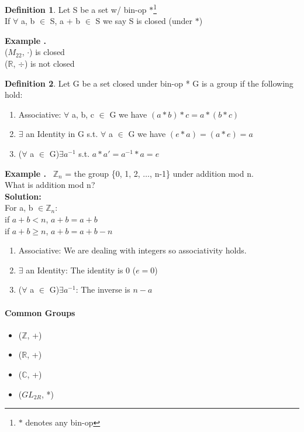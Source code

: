 \documentclass{article}
\newcounter{example}
\newcounter{solution}
\theoremstyle{definition}
\newtheorem{definition}{Definition}[section]
\theoremstyle{claim}
\theoremstyle{remark}
\theoremstyle{theorem}
\newcommand\Example{%
  \stepcounter{example}%
  \textbf{Example \theexample.}~%
  \setcounter{solution}{0}%
}
\newcommand\TheSolution{%
  \textbf{Solution:}\\%
}
\begin{document}
\begin{flushleft}
\begin{definition}{Let S be a set w/ bin-op $*$\footnote{$*$ denotes any bin-op}}\\
If $\forall$ a, b $\in$ S, a + b $\in$ S we say S is closed (under $*$)
\end{definition}
\Example                            \\
($M_{22}$, $\cdot$) is closed       \\
($\mathbb{R}$, $\div$) is not closed\\
\begin{definition}{Let G be a set closed under bin-op *}
G is a group if the following hold:
\begin{enumerate}
  \item Associative: $\forall$ a, b, c $\in$ G we have $(a * b) * c = a * (b * c)$
  \item $\exists$ an Identity in G s.t. $\forall$ a $\in$ G we have $(e * a) = (a * e) = a$
  \item ($\forall$ a $\in$ G)$\exists a^{-1}$ s.t. $a * a\prime = a^{-1} * a = e$
\end{enumerate}
\end{definition}
\Example $\mathbb{Z}_{n}$ = the group \{0, 1, 2, $\dots$, n-1\} under addition mod n.\\
What is addition mod n?\newline \\

\TheSolution 
For a, b $\in \mathbb{Z}_{n}$:  \\
if $a + b < n$, $a + b = a + b$ \\
if $a + b \geq n$, $a + b = a + b - n$\newline\\

\begin{enumerate}
  \item Associative: We are dealing with integers so associativity holds.
  \item $\exists$ an Identity: The identity is 0 ($e = 0$) 
  \item ($\forall$ a $\in$ G)$\exists a^{-1}$: The inverse is $n - a$
\end{enumerate}

\paragraph{Common Groups}
\begin{itemize}
  \item ($\mathbb{Z}$, +)
  \item ($\mathbb{R}$, +)
  \item ($\mathbb{C}$, +)
  \item ($GL_{2R}$, *)
\end{itemize}


\end{flushleft}
\end{document}

